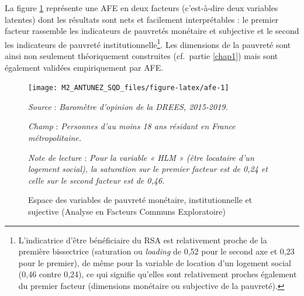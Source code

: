 \documentclass[12pt,a4paper]{reedthesis}
\begin{document}
La figure \ref{fig:afe} représente une AFE en deux facteurs (c'est-à-dire deux variables latentes) dont les résultats sont nets et facilement interprétables : le premier facteur rassemble les indicateurs de pauvretés monétaire et subjective et le second les indicateurs de pauvreté institutionnelle\footnote{L'indicatrice d'être bénéficiaire du RSA est relativement proche de la première bissectrice (saturation ou \emph{loading} de 0,52 pour le second axe et 0,23 pour le premier), de même pour la variable de location d'un logement social (0,46 contre 0,24), ce qui signifie qu'elles sont relativement proches également du premier facteur (dimensions monétaire ou subjective de la pauvreté).}. Les dimensions de la pauvreté sont ainsi non seulement théoriquement construites (cf.~partie \ref{chap1}) mais sont également validées empiriquement par AFE.
\begin{figure}[!ht]

{\centering \texttt{[image: M2\_ANTUNEZ\_SQD\_files/figure-latex/afe-1]} 

}

\caption[Espace des variables de pauvreté monétaire, institutionnelle et sujective (Analyse en Facteurs Communs Exploratoire)]{Espace des variables de pauvreté monétaire, institutionnelle et sujective (Analyse en Facteurs Communs Exploratoire)}\label{fig:afe}

\footnotesize


\emph{Source} : \emph{Baromètre d’opinion de la DREES, 2015-2019.}


\emph{Champ} : \emph{Personnes d’au moins 18 ans résidant en France métropolitaine.}


\emph{Note de lecture} : \emph{Pour la variable « HLM » (être locataire d’un logement social), la saturation sur le premier facteur est de 0,24 et celle sur le second facteur est de 0,46.}
\normalsize\end{figure}
\end{document}
